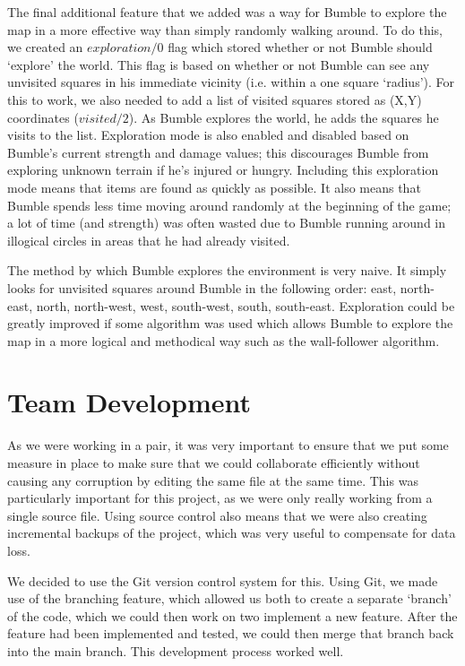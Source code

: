 \documentclass[a4paper,oneside]{report}
\begin{document}
The final additional feature that we added was a way for Bumble to explore the map in a more effective way than simply randomly walking around. To do this, we created an $exploration/0$ flag which stored whether or not Bumble should `explore' the world. This flag is based on whether or not Bumble can see any unvisited squares in his immediate vicinity (i.e. within a one square `radius'). For this to work, we also needed to add a list of visited squares stored as (X,Y) coordinates ($visited/2$). As Bumble explores the world, he adds the squares he visits to the list. Exploration mode is also enabled and disabled based on Bumble's current strength and damage values; this discourages Bumble from exploring unknown terrain if he's injured or hungry. Including this exploration mode means that items are found as quickly as possible. It also means that Bumble spends less time moving around randomly at the beginning of the game; a lot of time (and strength) was often wasted due to Bumble running around in illogical circles in areas that he had already visited.

The method by which Bumble explores the environment is very naive. It simply looks for unvisited squares around Bumble in the following order: east, north-east, north, north-west, west, south-west, south, south-east. Exploration could be greatly improved if some algorithm was used which allows Bumble to explore the map in a more logical and methodical way such as the wall-follower algorithm.

\section{Team Development}
	
As we were working in a pair, it was very important to ensure that we put some measure in place to make sure that we could collaborate efficiently without causing any corruption by editing the same file at the same time. This was particularly important for this project, as we were only really working from a single source file. Using source control also means that we were also creating incremental backups of the project, which was very useful to compensate for data loss.

We decided to use the Git version control system for this. Using Git, we made use of the branching feature, which allowed us both to create a separate `branch' of the code, which we could then work on two implement a new feature. After the feature had been implemented and tested, we could then merge that branch back into the main branch. This development process worked well.
\end{document}

